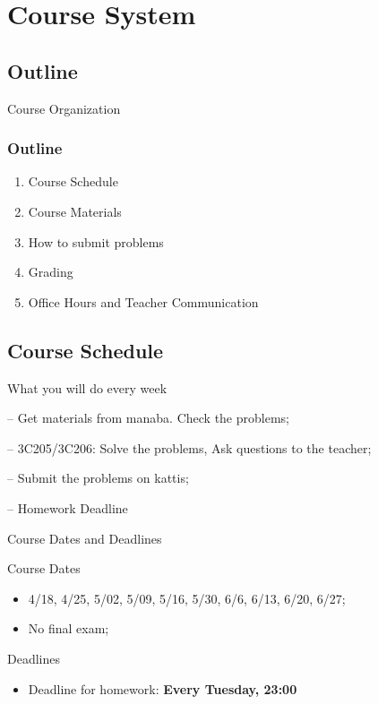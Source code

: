 
\section{Course System}
\subsection{Outline}

\begin{frame}
  \centering
  {\huge
    Course Organization
  }
\end{frame}

\begin{frame}
  \frametitle{Outline}
  \begin{enumerate}
    \item Course Schedule
    \item Course Materials
    \item How to submit problems
    \item Grading
    \item Office Hours and Teacher Communication
  \end{enumerate}
\end{frame}

\subsection{Course Schedule}
\begin{frame}{What you will do every week}
  \begin{description}
    \item[Monday] -- Get materials from \alert{manaba}. Check the problems;
    \medskip
    \item[Tuesday] -- 3C205/3C206: Solve the problems, Ask questions to the teacher;
    \medskip
    \item[Entire Week] -- Submit the problems on \alert{kattis};
    \medskip
    \item[Next Tue] -- Homework Deadline
  \end{description}
\end{frame}

\begin{frame}{Course Dates and Deadlines}
  \begin{block}{Course Dates}
    \begin{itemize}
    \item 4/18, 4/25, 5/02, 5/09, 5/16, 5/30, 6/6, 6/13, 6/20, 6/27;
    \item No final exam;
    \end{itemize}
  \end{block}
  \begin{block}{Deadlines}
    \begin{itemize}
      \item Deadline for homework: {\bf Every Tuesday, 23:00}
    \end{itemize}
  \end{block}
\end{frame}

